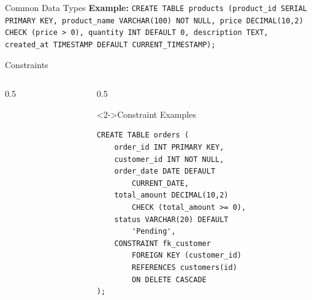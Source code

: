 \documentclass[aspectratio=169,11pt]{beamer}
\begin{document}
\begin{frame}{Common Data Types}
\pause
\vspace{0.3cm}
{\scriptsize
\textbf{Example:} \texttt{CREATE TABLE products (product\_id SERIAL PRIMARY KEY, product\_name VARCHAR(100) NOT NULL, price DECIMAL(10,2) CHECK (price > 0), quantity INT DEFAULT 0, description TEXT, created\_at TIMESTAMP DEFAULT CURRENT\_TIMESTAMP);}
}
\end{frame}

\begin{frame}{Constraints}
\begin{columns}[T]
\begin{column}{0.5\textwidth}
\end{column}

\pause
\begin{column}{0.5\textwidth}
\begin{exampleblock}<2->{Constraint Examples}
{\scriptsize
\begin{verbatim}
CREATE TABLE orders (
    order_id INT PRIMARY KEY,
    customer_id INT NOT NULL,
    order_date DATE DEFAULT 
        CURRENT_DATE,
    total_amount DECIMAL(10,2) 
        CHECK (total_amount >= 0),
    status VARCHAR(20) DEFAULT 
        'Pending',
    CONSTRAINT fk_customer
        FOREIGN KEY (customer_id)
        REFERENCES customers(id)
        ON DELETE CASCADE
);
\end{verbatim}
}
\end{exampleblock}
\end{column}
\end{columns}
\end{frame}

\end{document}
